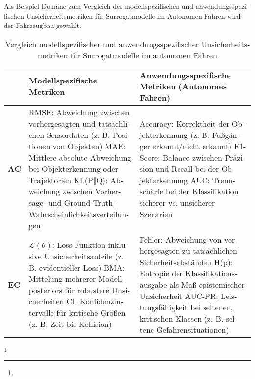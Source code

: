 \begin{otherlanguage}{ngerman}
Als Beispiel-Domäne zum Vergleich der modellspezifischen und anwendungsspezifischen Unsicherheitsmetriken für Surrogatmodelle im Autonomen Fahren wird der Fahrzeugbau gewählt. 

\begin{table}[!htpb]
  \centering
  \scriptsize
  \begin{tabularx}{\textwidth}{|l|X|X|}
    \hline
    & \textbf{Modellspezifische Metriken} & \textbf{Anwendungsspezifische Metriken (Autonomes Fahren)} \\
    \hline
    \textbf{AC} & 
    RMSE: Abweichung zwischen vorhergesagten und tatsächlichen Sensordaten (z. B. Positionen von Objekten) \newline
    MAE: Mittlere absolute Abweichung bei Objekterkennung oder Trajektorien \newline
    KL(P‖Q): Abweichung zwischen Vorhersage- und Ground-Truth-Wahrscheinlichkeitsverteilungen & 
    Accuracy: Korrektheit der Objekterkennung (z. B. Fußgänger erkannt/nicht erkannt) \newline
    F1-Score: Balance zwischen Präzision und Recall bei der Objekterkennung \newline
    AUC: Trennschärfe bei der Klassifikation sicherer vs. unsicherer Szenarien \\
    \hline
    \textbf{EC} & 
    \( \mathcal{L}(\theta) \): Loss-Funktion inklusive Unsicherheitsanteile (z. B. evidentieller Loss) \newline
    BMA: Mittelung mehrerer Modellposteriors für robustere Unsicherheiten \newline
    CI: Konfidenzintervalle für kritische Größen (z. B. Zeit bis Kollision) & 
    Fehler: Abweichung von vorhergesagten zu tatsächlichen Sicherheitsabständen \newline
    H(p): Entropie der Klassifikationsausgabe als Maß epistemischer Unsicherheit \newline
    AUC-PR: Leistungsfähigkeit bei seltenen, kritischen Klassen (z. B. seltene Gefahrensituationen) \\
    \hline
  \end{tabularx}
  \caption{Vergleich modellspezifischer und anwendungsspezifischer Unsicherheitsmetriken für Surrogatmodelle im autonomen Fahren}
  \label{tab:chapter6r71}
\end{table}

\footnote{%

}
\end{otherlanguage}
